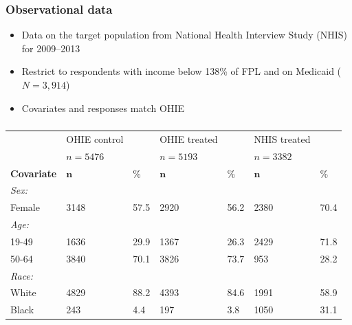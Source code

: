 \documentclass{beamer}
\begin{document}
\begin{frame}
\frametitle{Observational data}
\begin{itemize}
\item Data on the target population from National Health Interview Study (NHIS) \cite{NHIS} for 2009--2013
\item Restrict to respondents with income below 138\% of FPL and on Medicaid ($N=3,914$)
\item Covariates and responses match OHIE
\end{itemize}
\end{frame}

\begin{frame}
\frametitle{}
{\tiny
\begin{singlespace}
\begin{landscape}
\begin{longtable}{lllllll}
  & OHIE control &  & OHIE treated &  & NHIS treated&  \\ 
  & $n=5476$ &  & $n=5193$ &  & $n=3382$ &  \\  
  \hline   
    \hline   
 \textbf{Covariate} &  $\mathbf{n}$ & $\mathbf{\%}$ & $\mathbf{n}$ & $\mathbf{\%}$ & $\mathbf{n}$ & $\mathbf{\%}$ \\ 
\hline
\textit{Sex:} &  & & &  &  & \\ 

\hspace{3mm} Female & 3148 & 57.5 & 2920 & 56.2 & 2380 & 70.4 \\ 
\textit{Age:} &  & & &  &  & \\ 
\hspace{3mm}19-49 & 1636 & 29.9 & 1367 & 26.3 & 2429 & 71.8  \\ 

\hspace{3mm}50-64 & 3840 & 70.1 & 3826 & 73.7 & 953 & 28.2 \\ 
\textit{Race:} &  & & &  &  & \\ 
\hspace{3mm}White & 4829 & 88.2 & 4393 & 84.6 & 1991 & 58.9  \\ 

\hspace{3mm}Black & 243 & 4.4 & 197 & 3.8 & 1050 & 31.1  \\ 


\end{longtable}
\end{landscape}
\end{singlespace}}
\end{frame}
\end{document}
